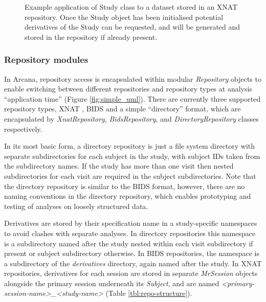 \documentclass[smallextended]{svjour3}       %
\begin{document}
\begin{figure}

\caption{Example application of Study class to a dataset stored in an XNAT
repository. Once the Study object has been initialised potential
derivatives of the Study can be requested, and will be generated and
stored in the repository if already present.}
\label{fig:study_application}
\end{figure}

\subsubsection*{Repository modules}\label{repository-modules}

In Arcana, repository access is encapsulated within modular
\emph{Repository} objects to enable switching between different
repositories and repository types at analysis ``application time''
(Figure \ref{fig:simple_uml}). There are currently three supported repository types, XNAT
\citep{marcus_extensible_2007}, BIDS \citep{gorgolewski_brain_2016} and a simple
``directory'' format, which are encapsulated by \emph{XnatRepository},
\emph{BidsRepository}, and \emph{DirectoryRepository} classes
respectively.

In its most basic form, a directory repository is just a file system
directory with separate subdirectories for each subject in the study,
with subject IDs taken from the subdirectory names. If the study has
more than one visit then nested subdirectories for each visit are
required in the subject subdirectories. Note that the directory
repository is similar to the BIDS format, however, there are no naming
conventions in the directory repository, which enables prototyping and
testing of analyses on loosely structured data.

Derivatives are stored by their specification name in a study-specific
namespaces to avoid clashes with separate analyses. In directory
repositories this namespace is a subdirectory named after the study
nested within each visit subdirectory if present or subject subdirectory
otherwise. In BIDS repositories, the namespace is a subdirectory of the
\emph{derivatives} directory, again named after the study. In XNAT
repositories, derivatives for each session are stored in separate
\emph{MrSession} objects alongside the primary session underneath its
\emph{Subject}, and are named
\emph{\textless{}primary-session-name\textgreater{}\_\textless{}study-name\textgreater{}}
(Table \ref{tbl:repo-structure}).
\end{document}
